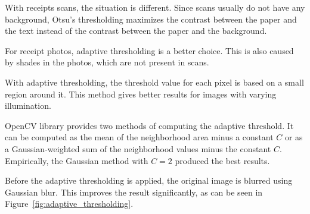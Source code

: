 \documentclass[
  digital, %
  table,   %
  oneside, %
  lof,     %
  lot,     %
]{fithesis3}
\begin{document}
\begin{enumerate}
    With receipts scans, the situation is different. Since scans usually do not have any background, Otsu's thresholding maximizes the contrast between the paper and the text instead of the contrast between the paper and the background.
    
    For receipt photos, adaptive thresholding is a better choice. This is also caused by shades in the photos, which are not present in scans.
    
    With adaptive thresholding, the threshold value for each pixel is based on a small region around it. This method gives better results for images with varying illumination.~\cite{OpenCVThresholding}
    
    OpenCV library provides two methods of computing the adaptive threshold. It can be computed as the mean of the neighborhood area minus a constant $C$ or as a Gaussian-weighted sum of the neighborhood values minus the constant $C$. Empirically, the Gaussian method with $C = 2$ produced the best results.
    
    Before the adaptive thresholding is applied, the original image is blurred using Gaussian blur. This improves the result significantly, as can be seen in Figure~\ref{fig:adaptive_thresholding}.
    

\end{enumerate}
\end{document}
